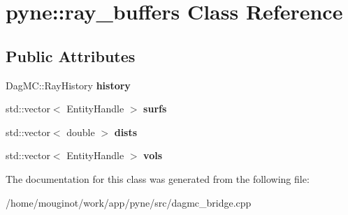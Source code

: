 \hypertarget{classpyne_1_1ray__buffers}{}\section{pyne\+:\+:ray\+\_\+buffers Class Reference}
\label{classpyne_1_1ray__buffers}
\subsection*{Public Attributes}
\begin{DoxyCompactItemize}
\item 
\mbox{\label{classpyne_1_1ray__buffers_adb3331dbf290b1c6d44c37931a917a7e}} 
Dag\+M\+C\+::\+Ray\+History {\bfseries history}
\item 
\mbox{\label{classpyne_1_1ray__buffers_ac2a784c86703f7253861ceaa73ba5e6b}} 
std\+::vector$<$ Entity\+Handle $>$ {\bfseries surfs}
\item 
\mbox{\label{classpyne_1_1ray__buffers_a2904cd95dd5c1cb04ca796cf025bced1}} 
std\+::vector$<$ double $>$ {\bfseries dists}
\item 
\mbox{\label{classpyne_1_1ray__buffers_a2d059fcf9432e03b28eade60308b2498}} 
std\+::vector$<$ Entity\+Handle $>$ {\bfseries vols}
\end{DoxyCompactItemize}


The documentation for this class was generated from the following file\+:\begin{DoxyCompactItemize}
\item 
/home/mouginot/work/app/pyne/src/dagmc\+\_\+bridge.\+cpp\end{DoxyCompactItemize}
